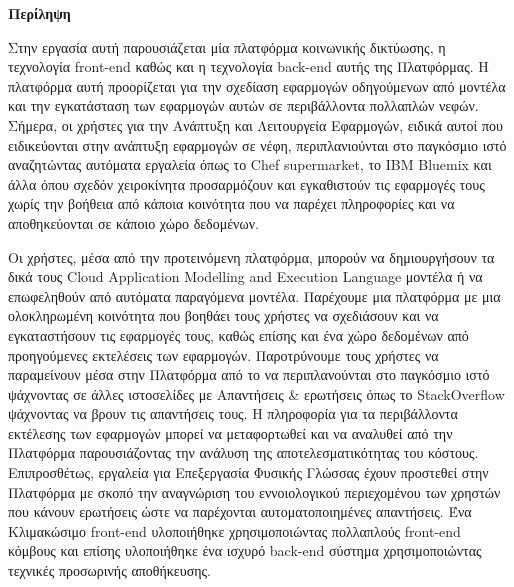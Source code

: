 \thispagestyle{empty}
\begin{titlepage}
\begin{center}
{\bf\Large{Περίληψη}}\\
\end{center}

\indent Στην εργασία αυτή παρουσιάζεται μία πλατφόρμα κοινωνικής δικτύωσης, η τεχνολογία front-end καθώς και η τεχνολογία back-end αυτής της Πλατφόρμας. H πλατφόρμα αυτή προορίζεται για την σχεδίαση εφαρμογών οδηγούμενων από μοντέλα και την εγκατάσταση των εφαρμογών αυτών σε περιβάλλοντα πολλαπλών νεφών. Σήμερα, οι χρήστες για την Ανάπτυξη και Λειτουργεία Εφαρμογών, ειδικά αυτοί που ειδικεύονται στην ανάπτυξη εφαρμογών σε νέφη, περιπλανιούνται στο παγκόσμιο ιστό αναζητώντας αυτόματα εργαλεία όπως το Chef supermarket, το IBM Bluemix και άλλα όπου σχεδόν χειροκίνητα προσαρμόζουν και εγκαθιστούν τις εφαρμογές τους χωρίς την βοήθεια από κάποια κοινότητα που να παρέχει πληροφορίες και να αποθηκεύονται σε κάποιο χώρο δεδομένων. 

Οι χρήστες, μέσα από την προτεινόμενη πλατφόρμα, μπορούν να δημιουργήσουν τα δικά τους Cloud Application Modelling and Execution Language μοντέλα ή να επωφεληθούν από αυτόματα παραγόμενα μοντέλα. Παρέχουμε μια πλατφόρμα με μια ολοκληρωμένη  κοινότητα που βοηθάει τους χρήστες να σχεδιάσουν και να εγκαταστήσουν τις εφαρμογές τους, καθώς επίσης και ένα χώρο δεδομένων από προηγούμενες εκτελέσεις των εφαρμογών. Παροτρύνουμε τους χρήστες να παραμείνουν μέσα στην Πλατφόρμα από το να περιπλανούνται στο παγκόσμιο ιστό ψάχνοντας σε άλλες ιστοσελίδες με Απαντήσεις \& ερωτήσεις όπως το StackOverflow ψάχνοντας να βρουν τις απαντήσεις τους. H πληροφορία για τα περιβάλλοντα εκτέλεσης των εφαρμογών μπορεί να μεταφορτωθεί και να αναλυθεί από την Πλατφόρμα παρουσιάζοντας την ανάλυση της αποτελεσματικότητας του κόστους. Επιπροσθέτως, εργαλεία για Επεξεργασία Φυσικής Γλώσσας έχουν προστεθεί στην Πλατφόρμα με σκοπό την αναγνώριση του εννοιολογικού περιεχομένου των χρηστών που κάνουν ερωτήσεις ώστε να παρέχονται αυτοματοποιημένες απαντήσεις. Ένα Κλιμακώσιμο front-end υλοποιήθηκε χρησιμοποιώντας πολλαπλούς front-end κόμβους και επίσης υλοποιήθηκε ένα ισχυρό back-end σύστημα χρησιμοποιώντας τεχνικές προσωρινής αποθήκευσης. 

\vfill

\end{titlepage}


